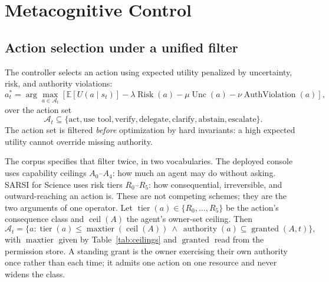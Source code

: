 \documentclass[11pt]{article}
\newcommand{\op}[1]{\operatorname{#1}}
\begin{document}
\section{Metacognitive Control}
\label{sec:control}

\subsection{Action selection under a unified filter}
The controller selects an action using expected utility penalized by uncertainty, risk, and authority violations:
\begin{equation}
a^*_t = \arg\max_{a \in \mathcal{A}_t} \left[\mathbb{E}[U(a \mid s_t)] - \lambda \op{Risk}(a) - \mu \op{Unc}(a) - \nu \op{AuthViolation}(a)\right],
\label{eq:action}
\end{equation}
over the action set
\begin{equation}
\mathcal{A}_t \subseteq \{\text{act}, \text{use tool}, \text{verify}, \text{delegate}, \text{clarify}, \text{abstain}, \text{escalate}\}.
\label{eq:actionset}
\end{equation}
The action set is filtered \emph{before} optimization by hard invariants: a high expected utility cannot override missing authority.

The corpus specifies that filter twice, in two vocabularies. The deployed console uses capability ceilings $A_0$--$A_4$: how much an agent may do without asking. SARSI for Science uses risk tiers $R_0$--$R_5$: how consequential, irreversible, and outward-reaching an action is. These are not competing schemes; they are the two arguments of one operator. Let $\op{tier}(a) \in \{R_0,\dots,R_5\}$ be the action's consequence class and $\op{ceil}(A) $ the agent's owner-set ceiling. Then
\begin{equation}
\mathcal{A}_t = \{a : \op{tier}(a) \le \op{maxtier}(\op{ceil}(A))\ \wedge\ \op{authority}(a) \subseteq \op{granted}(A,t)\},
\label{eq:filter}
\end{equation}
with $\op{maxtier}$ given by Table~\ref{tab:ceilings} and $\op{granted}$ read from the permission store. A standing grant is the owner exercising their own authority once rather than each time; it admits one action on one resource and never widens the class.
\end{document}
